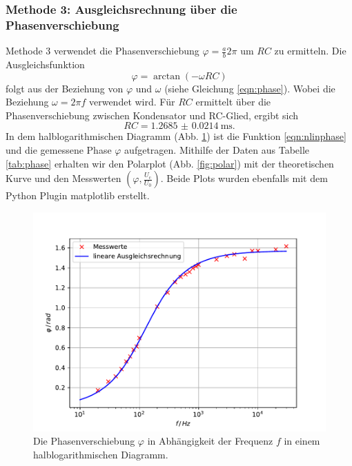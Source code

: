 \subsubsection{Methode 3: Ausgleichsrechnung über die Phasenverschiebung}
\label{sec:met3}
Methode 3 verwendet die Phasenverschiebung $\varphi = \frac{a}{b}2\pi$ um $RC$ zu ermitteln.
Die Ausgleichsfunktion
\begin{equation}
    \varphi = \arctan(-\omega RC)
    \label{eqn:nlinphase}
\end{equation}
folgt aus der Beziehung von $\varphi$ und $\omega$ (siehe Gleichung \ref{eqn:phase}).
Wobei die Beziehung $\omega = 2\pi f$ verwendet wird.
Für $RC$ ermittelt über die Phasenverschiebung zwischen Kondensator und RC-Glied, ergibt sich
\begin{equation*}
    RC = \SI{1.2685(214)}{\milli\second} .
\end{equation*}
In dem halblogarithmischen Diagramm (Abb. \ref{fig:phase}) ist die Funktion \ref{eqn:nlinphase} und die gemessene Phase $\varphi$ aufgetragen.
Mithilfe der Daten aus Tabelle \ref{tab:phase} erhalten wir den Polarplot (Abb. \ref{fig:polar}) mit der theoretischen Kurve und den Messwerten $(\varphi, \frac{U_\text{c}}{U_0})$.
Beide Plots wurden ebenfalls mit dem Python Plugin matplotlib \cite{matplotlib} erstellt.
\begin{figure}
    \centering
    \includegraphics[width=\textwidth]{content/data/plotc.pdf}
    \caption{Die Phasenverschiebung $\varphi$ in Abhängigkeit der Frequenz $f$ in einem halblogarithmischen Diagramm.}
    \label{fig:phase}
\end{figure}

